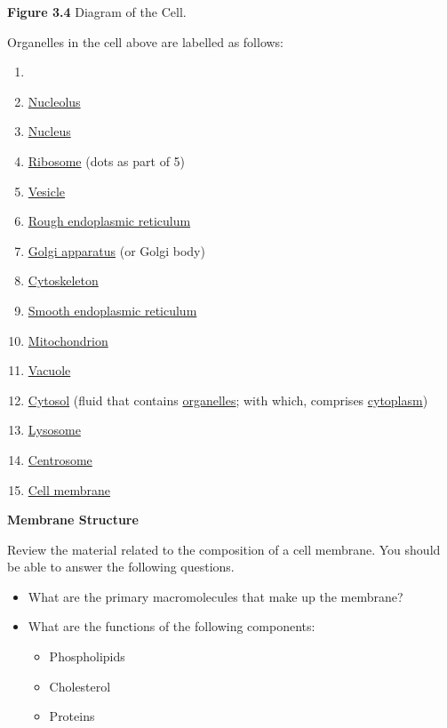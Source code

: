\documentclass[
  letterpaper,
  DIV=11,
  numbers=noendperiod]{scrreprt}
\begin{document}
\textbf{Figure 3.4} Diagram of the Cell.

Organelles in the cell above are labelled as follows:

\begin{enumerate}
\def\labelenumi{\arabic{enumi}.}
\item
\item
  \href{https://en.wikipedia.org/wiki/Nucleolus}{Nucleolus}
\item
  \href{https://en.wikipedia.org/wiki/Cell_nucleus}{Nucleus}
\item
  \href{https://en.wikipedia.org/wiki/Ribosome}{Ribosome} (dots as part
  of 5)
\item
  \href{https://en.wikipedia.org/wiki/Vesicle_(biology_and_chemistry)}{Vesicle}
\item
  \href{https://en.wikipedia.org/wiki/Rough_endoplasmic_reticulum}{Rough
  endoplasmic reticulum}
\item
  \href{https://en.wikipedia.org/wiki/Golgi_apparatus}{Golgi apparatus}
  (or Golgi body)
\item
  \href{https://en.wikipedia.org/wiki/Cytoskeleton}{Cytoskeleton}
\item
  \href{https://en.wikipedia.org/wiki/Smooth_endoplasmic_reticulum}{Smooth
  endoplasmic reticulum}
\item
  \href{https://en.wikipedia.org/wiki/Mitochondrion}{Mitochondrion}
\item
  \href{https://en.wikipedia.org/wiki/Vacuole}{Vacuole}
\item
  \href{https://en.wikipedia.org/wiki/Cytosol}{Cytosol} (fluid that
  contains \href{https://en.wikipedia.org/wiki/Organelle}{organelles};
  with which, comprises
  \href{https://en.wikipedia.org/wiki/Cytoplasm}{cytoplasm})
\item
  \href{https://en.wikipedia.org/wiki/Lysosome}{Lysosome}
\item
  \href{https://en.wikipedia.org/wiki/Centrosome}{Centrosome}
\item
  \href{https://en.wikipedia.org/wiki/Cell_membrane}{Cell membrane}
\end{enumerate}

\textbf{Membrane Structure}

Review the material related to the composition of a cell membrane. You
should be able to answer the following questions.

\begin{itemize}
\item
  What are the primary macromolecules that make up the membrane?
\item
  What are the functions of the following components:

  \begin{itemize}
  \item
    Phospholipids
  \item
    Cholesterol
  \item
    Proteins
  \end{itemize}
\end{itemize}
\end{document}
